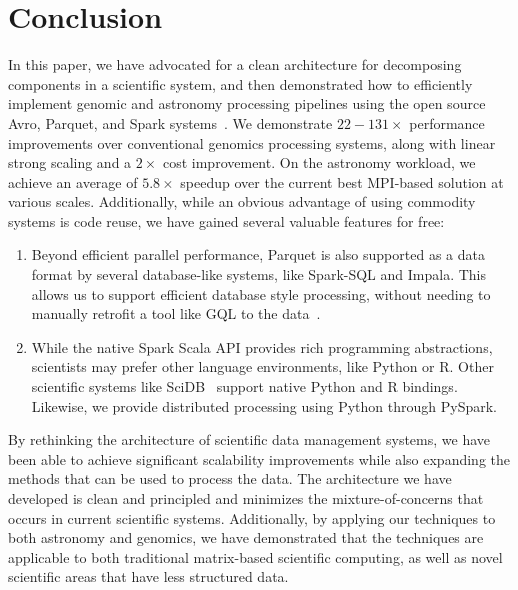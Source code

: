 \documentclass{acm_proc_article-sp}
\begin{document}
\section{Conclusion}
\label{sec:conclusion}

In this paper, we have advocated for a clean architecture for decomposing components in a scientific
system, and then demonstrated how to efficiently implement genomic and astronomy processing
pipelines using the open source Avro, Parquet, and Spark systems~\cite{avro, parquet, zaharia10}.
We demonstrate $22-131\times$ performance improvements over conventional genomics processing
systems, along with linear strong scaling and a $2\times$ cost improvement. On the astronomy
workload, we achieve an average of $5.8\times$ speedup over the current best MPI-based solution at various scales.
Additionally, while
an obvious advantage of using commodity systems is code reuse, we have gained several valuable
features for free:

\begin{enumerate}
\item Beyond efficient parallel performance, Parquet is also supported as a data format by several
database-like systems, like Spark-SQL and Impala. This allows us to support efficient database style
processing, without needing to manually retrofit a tool like GQL to the data~\cite{kozanitis14}.
\item While the native Spark Scala API provides rich programming abstractions, scientists may prefer
other language environments, like Python or R. Other scientific systems like SciDB~\cite{brown10}
support native Python and R bindings. Likewise, we provide distributed processing using Python
through PySpark.
\end{enumerate}

By rethinking the architecture of scientific data management systems, we have been able to achieve
significant scalability improvements while also expanding the methods that can be used to process
the data. The architecture we have developed is clean and principled and minimizes the
mixture-of-concerns that occurs in current scientific systems. Additionally, by applying our techniques
to both astronomy and genomics, we have demonstrated that the techniques are applicable to both
traditional matrix-based scientific computing, as well as novel scientific areas that have less structured
data.

\balancecolumns

\clearpage
\end{document}
